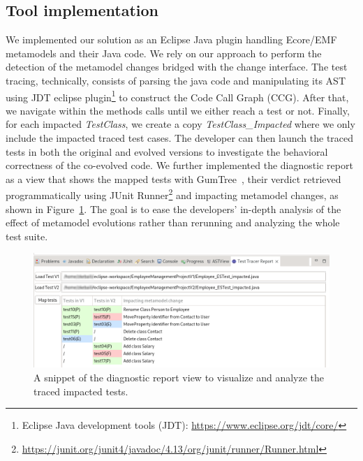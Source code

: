 \subsection{Tool implementation}

We implemented our solution as an Eclipse Java plugin handling Ecore/EMF metamodels and their Java code. %
We rely on our approach \cite{khelladi2015detecting} to perform the detection of the metamodel changes bridged with the change interface. 
The test tracing, technically, consists of parsing the java code and manipulating its AST using JDT eclipse plugin\footnote{Eclipse Java development tools (JDT): \url{https://www.eclipse.org/jdt/core/}} to construct the Code Call Graph (CCG). After that, we navigate within the methods calls until we either reach a test or not. Finally, for each impacted \emph{TestClass}, we create a copy \emph{TestClass\_Impacted} where we only include the impacted traced test cases. The developer can then launch the traced tests in both the original and evolved versions to investigate the behavioral correctness of the co-evolved code. 
%
We further implemented the diagnostic report as a view that shows the mapped tests with GumTree~\cite{falleri2014fine}, their verdict retrieved programmatically using JUnit Runner\footnote{\url{https://junit.org/junit4/javadoc/4.13/org/junit/runner/Runner.html}} and impacting metamodel changes, as shown in Figure~\ref{fig:toolView}. The goal is to ease the developers' in-depth analysis of the effect of metamodel evolutions rather than rerunning and analyzing the whole test suite.

\begin{figure}[tb]
	\centering
	\includegraphics[width=1\textwidth]{./pics/chapter2pics/TestTraceReport.png}
	\caption{A snippet of the diagnostic report view to visualize and analyze the traced impacted tests.}
	\label{fig:toolView}
\end{figure}
